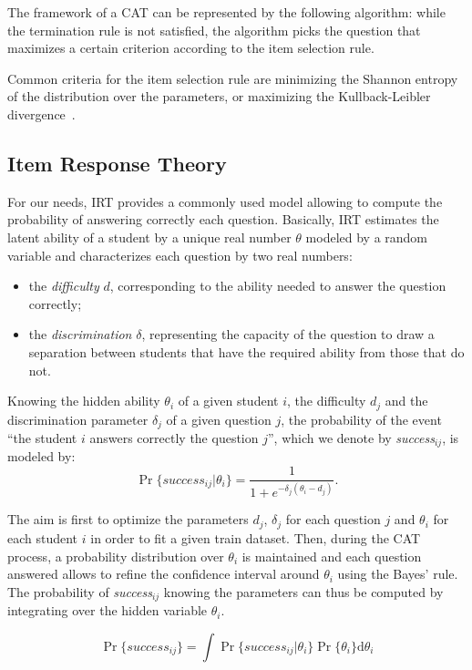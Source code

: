 \documentclass{sig-alternate}
\begin{document}
The framework of a CAT can be represented by the following algorithm: while the termination rule is not satisfied, the algorithm picks the question that maximizes a certain criterion according to the item selection rule.

Common criteria for the item selection rule are minimizing the Shannon entropy of the distribution over the parameters, or maximizing the Kullback-Leibler divergence~\citep{Xu2003}.

\subsection{Item Response Theory}

For our needs, IRT provides a commonly used model allowing to compute the probability of answering correctly each question. Basically, IRT estimates the latent ability of a student by a unique real number $\theta$ modeled by a random variable and characterizes each question by two real numbers:

\begin{itemize}
\item the \emph{difficulty} $d$, corresponding to the ability needed to answer the question correctly;
\item the \emph{discrimination} $\delta$, representing the capacity of the question to draw a separation between students that have the required ability from those that do not.
\end{itemize}

Knowing the hidden ability $\theta_i$ of a given student $i$, the difficulty $d_j$ and the discrimination parameter $\delta_j$ of a given question $j$, the probability of the event ``the student $i$ answers correctly the question $j$'', which we denote by \emph{success}$_{ij}$, is modeled by:
\[ \Pr\{success_{ij}|\theta_i\} = \frac1{1+e^{-\delta_j(\theta_i - d_j)}}. \]

The aim is first to optimize the parameters $d_j$, $\delta_j$ for each question $j$ and $\theta_i$ for each student $i$ in order to fit a given train dataset. Then, during the CAT process, a probability distribution over $\theta_i$ is maintained and each question answered allows to refine the confidence interval around $\theta_i$ using the Bayes' rule. The probability of \emph{success}$_{ij}$ knowing the parameters can thus be computed by integrating over the hidden variable $\theta_i$.

\[ \Pr\{success_{ij}\} = \int \Pr\{success_{ij}|\theta_i\} \Pr\{\theta_i\} \mathrm d\theta_i \]
\end{document}
